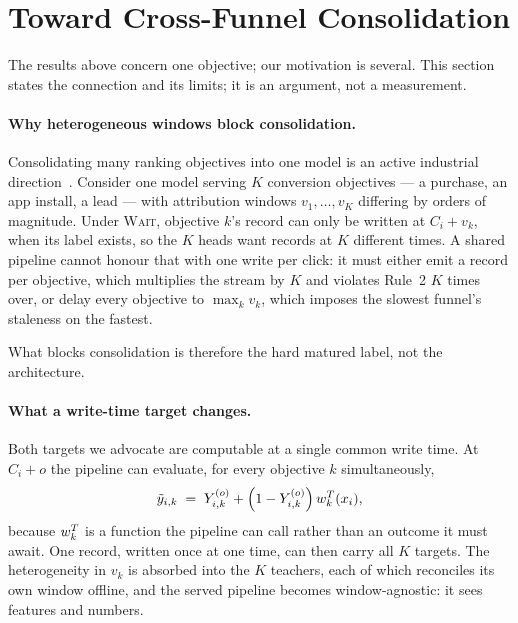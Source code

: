 \section{Toward Cross-Funnel Consolidation}
\label{sec:allinone}

The results above concern one objective; our motivation is several. This section states the
connection and its limits; it is an argument, not a measurement.

\paragraph{Why heterogeneous windows block consolidation.}
Consolidating many ranking objectives into one model is an active industrial
direction~\cite{meta2025gem}. Consider one model serving $K$ conversion objectives --- a
purchase, an app install, a lead --- with attribution windows $v_1,\dots,v_K$ differing by
orders of magnitude. Under \textsc{Wait}, objective $k$'s record can only be written at $C_i+v_k$, when its label
exists, so the $K$ heads want records at $K$ different times. A shared pipeline cannot honour
that with one write per click: it must either emit a record per objective, which multiplies the
stream by $K$ and violates Rule~2 $K$ times over, or delay every objective to
$\max_k v_k$, which imposes the slowest funnel's staleness on the fastest.

What blocks consolidation is therefore the hard matured label, not the architecture.

\paragraph{What a write-time target changes.}
Both targets we advocate are computable at a single common write time. At $C_i+o$ the pipeline
can evaluate, for every objective $k$ simultaneously,
\begin{equation}
  \tilde y_{i,k} \;=\; Y^{(o)}_{i,k} + \left(1-Y^{(o)}_{i,k}\right) w^{T}_k(x_i),
\end{equation}
because $w^{T}_k$ is a function the pipeline can call rather than an outcome it must await. One
record, written once at one time, can then carry all $K$ targets. The heterogeneity in $v_k$ is
absorbed into the $K$ teachers, each of which reconciles its own window offline, and the served
pipeline becomes window-agnostic: it sees features and numbers.

